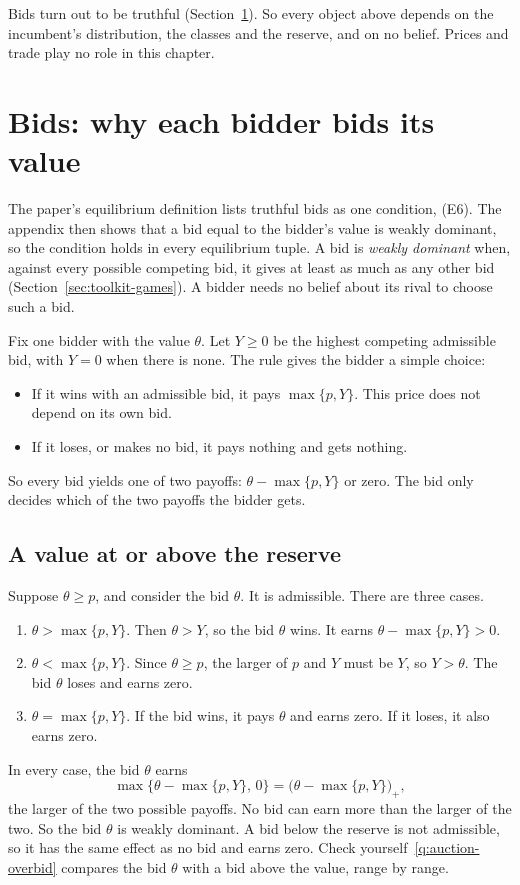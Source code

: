 Bids turn out to be truthful (Section~\ref{sec:auction-bids}). So every object above depends on the incumbent's
distribution, the classes and the reserve, and on no belief. Prices and trade play no role in this chapter.

\section{Bids: why each bidder bids its value}\label{sec:auction-bids}

The paper's equilibrium definition lists truthful bids as one condition, (E6). The appendix then shows that a
bid equal to the bidder's value is weakly dominant, so the condition holds in every equilibrium tuple. A bid
is \emph{weakly dominant} when, against every possible competing bid, it gives at least as much as any other bid
(Section~\ref{sec:toolkit-games}). A bidder needs no belief about its rival to choose such a bid.

Fix one bidder with the value \(\theta\). Let \(Y\ge0\) be the highest competing admissible bid, with \(Y=0\) when
there is none. The rule gives the bidder a simple choice:
\begin{itemize}
\item If it wins with an admissible bid, it pays \(\max\{p,Y\}\). This price does not depend on its own bid.
\item If it loses, or makes no bid, it pays nothing and gets nothing.
\end{itemize}
So every bid yields one of two payoffs: \(\theta-\max\{p,Y\}\) or zero. The bid only decides which of the two
payoffs the bidder gets.

\subsection*{A value at or above the reserve}

Suppose \(\theta\ge p\), and consider the bid \(\theta\). It is admissible. There are three cases.
\begin{enumerate}
\item \(\theta>\max\{p,Y\}\). Then \(\theta>Y\), so the bid \(\theta\) wins. It earns \(\theta-\max\{p,Y\}>0\).
\item \(\theta<\max\{p,Y\}\). Since \(\theta\ge p\), the larger of \(p\) and \(Y\) must be \(Y\), so
\(Y>\theta\). The bid \(\theta\) loses and earns zero.
\item \(\theta=\max\{p,Y\}\). If the bid wins, it pays \(\theta\) and earns zero. If it loses, it also earns
zero.
\end{enumerate}
In every case, the bid \(\theta\) earns
\[
\max\bigl\{\theta-\max\{p,Y\},\,0\bigr\}=\bigl(\theta-\max\{p,Y\}\bigr)_+,
\]
the larger of the two possible payoffs. No bid can earn more than the larger of the two. So the bid \(\theta\) is
weakly dominant. A bid below the reserve is not admissible, so it has the same effect as no bid and earns zero.
Check yourself~\ref{q:auction-overbid} compares the bid \(\theta\) with a bid above the value, range by range.


